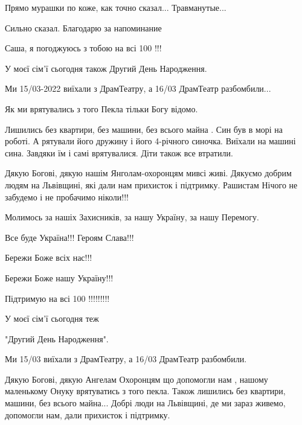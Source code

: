  
 
 
 
 

\qqSecCmt


Прямо мурашки по коже, как точно сказал... Травманутые...


Сильно сказал. Благодарю за напоминание


Саша, я погоджуюсь з тобою на всі 100 !!!\par
У моєї сім'ї сьогодня також Другий День Народження.\par
Ми 15/03-2022 виїхали з ДрамТеатру, а 16/03 ДрамТеатр разбомбили...\par
Як ми врятувались з того Пекла тільки Богу відомо.\par
Лишились без квартири, без машини, без всього майна . Син був в морі на роботі. А рятували його дружину і його 4-річного синочка. Виїхали на машині сина. Завдяки їм і самі врятувалися. Діти також все втратили.\par
Дякую Богові, дякую нашім Янголам-охоронцям мивсі живі. Дякуємо добрим людям на Львівщині, які дали нам прихисток і підтримку. Рашистам Нічого не забудемо і не пробачимо ніколи!!!\par
Молимось за нашіх Захисників, за нашу Україну, за нашу Перемогу.\par
Все буде Україна!!! Героям Слава!!!\par
Бережи Боже всіх нас!!!\par
Бережи Боже нашу Україну!!!\par


Підтримую на всі 100 !!!!!!!!!

У моєї сім'ї сьогодня теж

"Другий День Народження".

Ми 15/03 виїхали з ДрамТеатру, а 16/03 ДрамТеатр разбомбили.

Дякую Богові, дякую Ангелам Охоронцям що допомогли нам , нашому маленькому
Онуку врятуватись з того пекла. Також лишились без квартири, машини, без всього
майна... Добрі люди на Львівщині, де ми зараз живемо, допомогли нам, дали
прихисток і підтримку.

